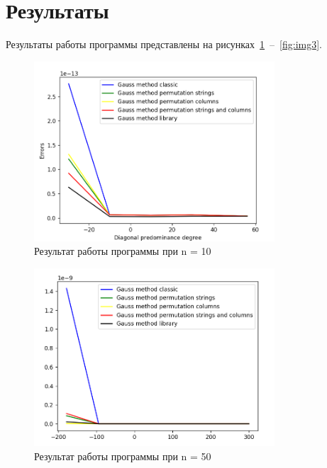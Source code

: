 \documentclass[a4paper, 14pt]{extarticle}
\begin{document}
\section{Результаты}\label{Sect::res}

Результаты работы программы представлены на рисунках~\ref{fig:img1}~--~\ref{fig:img3}.

\begin{figure}[!htb]
	\centering
	\includegraphics[width=0.8\textwidth]{img1}
\caption{Результат работы программы при n = 10}
\label{fig:img1}
\end{figure}

\begin{figure}[!htb]
	\centering
	\includegraphics[width=0.8\textwidth]{img2}
\caption{Результат работы программы при n = 50}
\label{fig:img2}
\end{figure}
\end{document}
